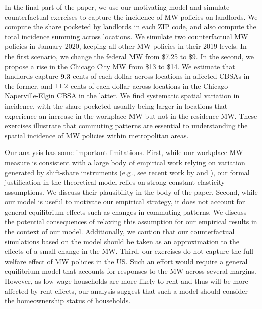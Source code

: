 In the final part of the paper, we use our motivating model and simulate 
counterfactual exercises to capture the incidence of MW policies on landlords.
We compute the share pocketed by landlords in each ZIP code, and also
compute the total incidence summing across locations.
We simulate two counterfactual MW policies in January 2020, keeping all other
MW policies in their 2019 levels.
In the first scenario, we change the federal MW from \$7.25 to \$9.
In the second, we propose a rise in the Chicago City MW from \$13 to \$14.
We estimate that landlords capture $\textnormal{9.3}$ cents of each 
dollar across locations in affected CBSAs in the former, and 
$\textnormal{11.2}$ cents of each dollar across locations in the 
Chicago-Naperville-Elgin CBSA in the latter.
We find systematic spatial variation in incidence,
with the share pocketed usually being larger in locations that experience an
increase in the workplace MW but not in the residence MW.
These exercises illustrate that commuting patterns are essential to 
understanding the spatial incidence of MW policies within metropolitan areas.


Our analysis has some important limitations.
First, while our workplace MW measure is consistent with a large body of 
empirical work relying on variation generated by shift-share instruments 
(e.g., see recent work by \cite{GoldsmithpinkhamEtAl2020} and
\cite{BorusyakHullJaravel2021}), our formal justification in the theoretical 
model relies on strong constant-elasticity assumptions.
We discuss their plausibility in the body of the paper.
Second, while our model is useful to motivate our empirical strategy, it does 
not account for general equilibrium effects such as changes in commuting 
patterns.
We discuss the potential consequences of relaxing this assumption for our 
empirical results in the context of our model.
Additionally, we caution that our counterfactual simulations based on the model 
should be taken as an approximation to the effects of a small change in the MW.
Third, our exercises do not capture the full welfare effect of MW policies
in the US.
Such an effort would require a general equilibrium model that accounts for 
responses to the MW across several margins.
However, as low-wage households are more likely to rent and thus will be more 
affected by rent effects, our analysis suggest that such a model should 
consider the homeownership status of households.



